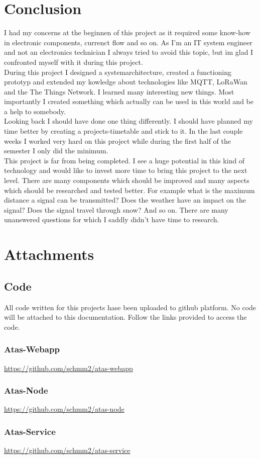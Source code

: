 \documentclass[a4paper,11pt, oneside]{report}
\theoremstyle{definition}
\begin{document}
\chapter{Conclusion}
I had my concerns at the beginnen of this project as it required some know-how in electronic components, currenct flow and so on. As I'm an IT system engineer and not an electronics technician I always tried to avoid this topic, but im glad I confronted myself with it during this project.\\[0.3cm]
During this project I designed a systemarchitecture, created a functioning prototyp and extended my kowledge about technologies like MQTT, LoRaWan and the The Things Network. I learned many interesting new things. Most importantly I created something which actually can be used in this world and be a help to somebody.\\[0.3cm]
Looking back I should have done one thing differently. I should have planned my time better by creating a projects-timetable and stick to it. In the last couple weeks I worked very hard on this project while during the first half of the semester I only did the minimum.\\[0.3cm]
This project is far from being completed. I see a huge potential in this kind of technology and would like to invest more time to bring this project to the next level. There are many components which should be improved and many aspects which should be researched and tested better. For example what is the maximum distance a signal can be transmitted? Does the weather have an impact on the signal? Does the signal travel through snow? And so on. There are many unanswered questions for which I saddly didn't have time to research.


\chapter{Attachments}
\section{Code}
All code written for this projects hase been uploaded to github platform. No code will be attached to this documentation. Follow the links provided to access the code.
\subsection{Atas-Webapp}
\url{https://github.com/schmm2/atas-webapp}
\subsection{Atas-Node}
\url{https://github.com/schmm2/atas-node}
\subsection{Atas-Service}
\url{https://github.com/schmm2/atas-service}


\printglossaries
\end{document}
